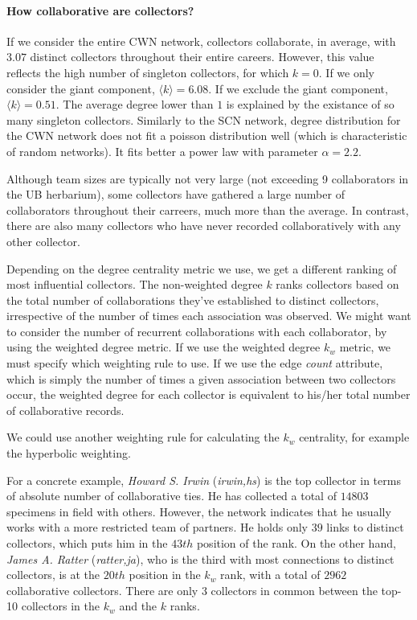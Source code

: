 \paragraph*{How collaborative are collectors?}
If we consider the entire CWN network, collectors collaborate, in average, with $3.07$ distinct collectors throughout their entire careers.
However, this value reflects the high number of singleton collectors, for which $k=0$.
If we only consider the giant component, $\langle k\rangle = 6.08$.
If we exclude the giant component, $\langle k\rangle = 0.51$. 
The average degree lower than $1$ is explained by the existance of so many singleton collectors.
%
Similarly to the SCN network, degree distribution for the CWN network does not fit a poisson distribution well (which is characteristic of random networks). 
It fits better a power law with parameter $\alpha=2.2$.


Although team sizes are typically not very large (not exceeding 9 collaborators in the UB herbarium), some collectors have gathered a large number of collaborators throughout their carreers, much more than the average. 
In contrast, there are also many collectors who have never recorded collaboratively with any other collector.

Depending on the degree centrality metric we use, we get a different ranking of most influential collectors.
The non-weighted degree $k$ ranks collectors based on the total number of collaborations they've established to distinct collectors, irrespective of the number of times each association was observed.
We might want to consider the number of recurrent collaborations with each collaborator, by using the weighted degree metric.
If we use the weighted degree $k_w$ metric, we must specify which weighting rule to use. 
If we use the edge \textit{count} attribute, which is simply the number of times a given association between two collectors occur, the weighted degree for each collector is equivalent to his/her total number of collaborative records. 

We could use another weighting rule for calculating the $k_w$ centrality, for example the hyperbolic weighting.


For a concrete example, \textit{Howard S. Irwin} (\textit{irwin,hs}) is the top collector in terms of absolute number of collaborative ties. He has collected a total of $14803$ specimens in field with others. However, the network indicates that he usually works with a more restricted team of partners. He holds only $39$ links to distinct collectors, which puts him in the $43th$ position of the rank. 
On the other hand, \textit{James A. Ratter} (\textit{ratter,ja}), who is the third with most connections to distinct collectors, is at the $20th$ position in the $k_w$ rank, with a total of $2962$ collaborative collectors.
There are only $3$ collectors in common between the top-10 collectors in the $k_w$ and the $k$ ranks.

